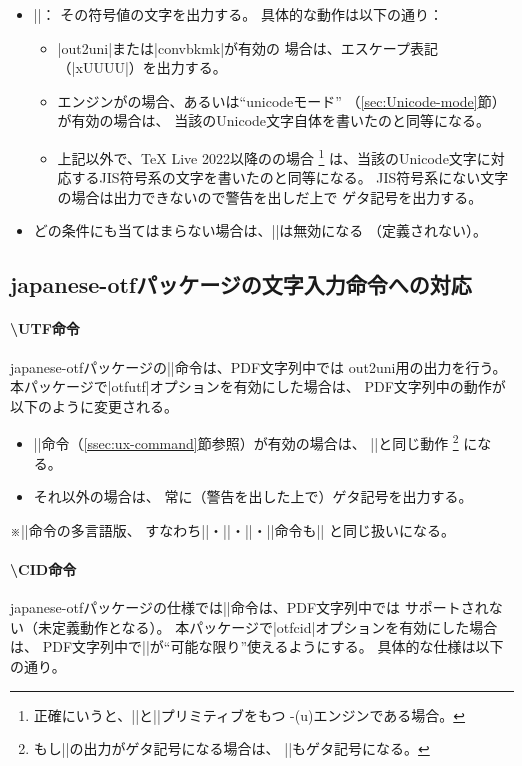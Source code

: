 \documentclass[uplatex,dvipdfmx,a4paper]{jsarticle}
\newcommand{\Pkg}[1]{\textsf{#1}}
\newcommand{\Meta}[1]{$\langle$\mbox{}#1\mbox{}$\rangle$}
\newcommand{\Note}{\par\noindent ※}
\newcommand{\Means}{：\quad}
\begin{document}
\begin{itemize}
\item |\Ux{|\Meta{Unicode符号値16進}|}|\Means
  その符号値の文字を出力する。
  具体的な動作は以下の通り：
  \begin{itemize}
  \item |out2uni|または|convbkmk|が有効の
  場合は、エスケープ表記（|\0xUUUU|）を出力する。
  \item エンジンが{\upLaTeX}の場合、あるいは“unicodeモード”
  （\ref{sec:Unicode-mode}節）が有効の場合は、
  当該のUnicode文字自体を書いたのと同等になる。
  \item 上記以外で、{\TeX} Live 2022以降の{\pLaTeX}の場合
  \footnote{正確にいうと、|\Uchar|と|\ucs|プリミティブをもつ
    {\TLe-(u)\pTeX}エンジンである場合。}%
  は、当該のUnicode文字に対応するJIS符号系の文字を書いたのと同等になる。
  JIS符号系にない文字の場合は出力できないので警告を出しだ上で
  ゲタ記号を出力する。
  \end{itemize}
  \item どの条件にも当てはまらない場合は、|\Ux|は無効になる
  （定義されない）。
\end{itemize}

\subsection{\Pkg{japanese-otf}パッケージの文字入力命令への対応}
\label{ssec:otf-package}

\paragraph{\textbackslash UTF命令}
\Pkg{japanese-otf}パッケージの|\UTF|命令は、PDF文字列中では
out2uni用の出力を行う。
本パッケージで|otfutf|オプションを有効にした場合は、
PDF文字列中の動作が以下のように変更される。

\begin{itemize}
\item |\Ux|命令（\ref{ssec:ux-command}節参照）が有効の場合は、
  |\Ux|と同じ動作
  \footnote{もし|\Ux|の出力がゲタ記号になる場合は、
    |\UTF|もゲタ記号になる。}%
  になる。
\item それ以外の場合は、
  常に（警告を出した上で）ゲタ記号を出力する。
\end{itemize}

\Note |\UTF|命令の多言語版、
すなわち|\UTFC|・|\UTFK|・|\UTFM|・|\UTFT|命令も|\UTF|%
と同じ扱いになる。

\paragraph{\textbackslash CID命令}
\Pkg{japanese-otf}パッケージの仕様では|\CID|命令は、PDF文字列中では
サポートされない（未定義動作となる）。
本パッケージで|otfcid|オプションを有効にした場合は、
PDF文字列中で|\CID|が“可能な限り”使えるようにする。
具体的な仕様は以下の通り。
\end{document}
